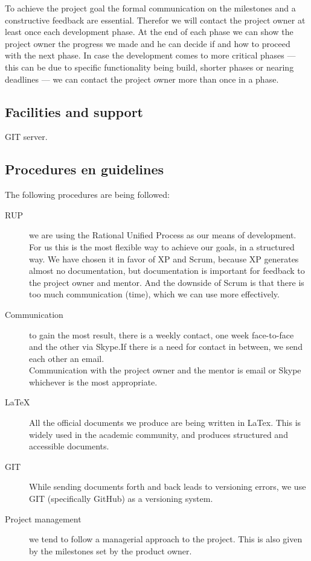 \documentclass{article}
\begin{document}
To achieve the project goal the formal communication on the milestones and a constructive feedback are essential. Therefor we will contact the project owner at least once each development phase. At the end of each phase we can show the project owner the progress we made and he can decide if and how to proceed with the next phase. In case the development comes to more critical phases --- this can be due to specific functionality being build, shorter phases or nearing deadlines --- we can contact the project owner more than once in a phase.

\subsection{Facilities and support}

GIT server.

\subsection{Procedures en guidelines}
The following procedures are being followed:
\begin{description}
  \item[RUP] we are using the Rational Unified Process as our means of development. For us this is the most flexible way to achieve our goals, in a structured way. We have chosen it in favor of XP and Scrum, because XP generates almost no documentation, but documentation is important for feedback to the project owner and mentor. And the downside of Scrum is that there is too much communication (time), which we can use more effectively.
  \item[Communication] to gain the most result, there is a weekly contact, one week face-to-face and the other via Skype.If there is a need for contact in between, we send each other an email.\\
Communication with the project owner and the mentor is email or Skype whichever is the most appropriate.
  \item[LaTeX] All the official documents we produce are being written in LaTex. This is widely used in the academic community, and produces structured and accessible documents.
  \item[GIT] While sending documents forth and back leads to versioning errors, we use GIT (specifically GitHub) as a versioning system.
  \item[Project management] we tend to follow a managerial approach to the project. This is also given by the milestones set by the product owner.
\end{description}
\end{document}
